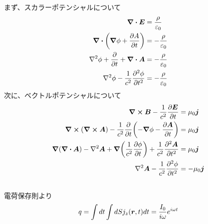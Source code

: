 \documentclass[../../sp_2017.tex]{subfiles}
\begin{document}
\subsection{}
まず、スカラーポテンシャルについて
\begin{equation}\begin{aligned}[b]
    \div \vb*{E}&=\frac{\rho}{\varepsilon_0}\\
    \div\qty(\grad\phi+\pdv{A}{t}) &=-\frac{\rho}{\varepsilon_0}\\
    \laplacian\phi+\pdv{t}+\div{\vb*{A}} &= -\frac{\rho}{\varepsilon_0}\\
    \laplacian\phi-\frac{1}{c^2}\pdv[2]{\phi}{t} &= -\frac{\rho}{\varepsilon_0}
\end{aligned}\end{equation}
次に、ベクトルポテンシャルについて
\begin{equation}\begin{aligned}[b]
   \curl\vb*{B}-\frac{1}{c^2}\pdv{\vb*{E}}{t} &= \mu_0 \vb*{j}\\
   \curl(\curl\vb*{A})-\frac{1}{c^2}\pdv{t}\qty(-\grad\phi-\pdv{\vb*{A}}{t}) &= \mu_0\vb*{j}\\
   \grad(\div\vb*{A})-\laplacian\vb*{A}+\grad\qty(\frac{1}{c^2}\pdv{\phi}{t})+\frac{1}{c^2}\pdv[2]{\vb*{A}}{t} &= \mu_0 \vb*{j}\\
    \laplacian \vb*{A}-\frac{1}{c^2}\pdv[2]{\phi}{t} &= -\mu_0 \vb*{j}
\end{aligned}\end{equation}

\subsection{}
電荷保存則より
\begin{equation}\begin{aligned}[b]
    q = \int dt\int dS  j_z(\vb*{r},t) dt = \frac{I_0}{i\omega}e^{i\omega t}
\end{aligned}\end{equation}
\end{document}
